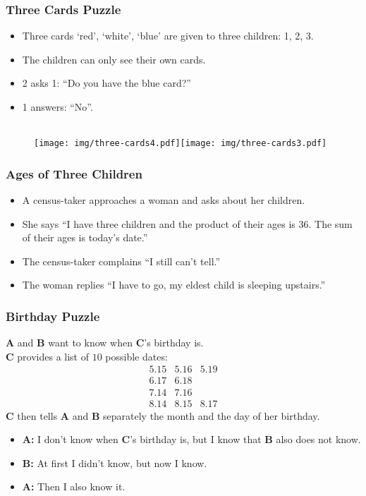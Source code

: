 \documentclass[UTF8,aspectratio=43,11pt,colorlinks,compress,openany]{beamer}%
\begin{document}
\begin{frame}\frametitle{Three Cards Puzzle}
\begin{itemize}
	\item Three cards `red', `white', `blue' are given to three children: 1, 2, 3.
	\item The children can only see their own cards.
	\item 2 asks 1: ``Do you have the blue card?''
	\item 1 answers: ``No''.
\end{itemize}
\begin{figure}[H]
\\
\texttt{[image: img/three-cards4.pdf]}\hspace*{25pt}\texttt{[image: img/three-cards3.pdf]}
\end{figure}
\end{frame}

\begin{frame}\frametitle{Ages of Three Children}
	\begin{itemize}
		\item A census-taker approaches a woman and asks about her children.
		\item She says ``I have three children and the product of their ages is $36$. The sum of their ages is today's date.''
		\item The census-taker complains ``I still can't tell.''
		\item The woman replies ``I have to go, my eldest child is sleeping upstairs.''
	\end{itemize}
\end{frame}

\begin{frame}\frametitle{Birthday Puzzle}
	\textbf{A} and \textbf{B} want to know when \textbf{C}'s birthday is.\\
	\textbf{C} provides a list of $10$ possible dates:
\[
\begin{array}{ccc}
5.15 &5.16 &5.19\\
6.17 &6.18\\
7.14 &7.16\\
8.14 &8.15 &8.17
\end{array}
\]
	\textbf{C} then tells \textbf{A} and \textbf{B} separately the month and the day of her birthday.
	\begin{itemize}
		\item \textbf{A:} I don't know when \textbf{C}'s birthday is, but I know that \textbf{B} also does not know.
		\item \textbf{B:} At first I didn't know, but now I know.
		\item \textbf{A:} Then I also know it.
	\end{itemize}
\end{frame}
\end{document}
